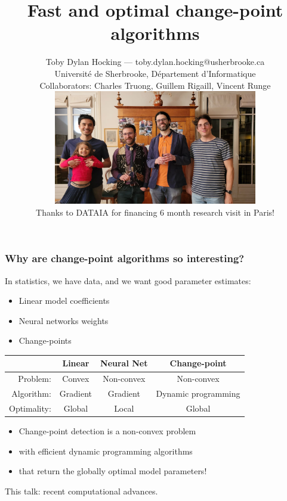 \documentclass{beamer}
\begin{document}
\title{
  Fast and optimal change-point algorithms
}

\author{
  Toby Dylan Hocking --- toby.dylan.hocking@usherbrooke.ca\\ 
  Université de Sherbrooke, Département d'Informatique\\
  Collaborators: Charles Truong, Guillem Rigaill, Vincent Runge\\
  \includegraphics[height=5cm]{2025-01-photo-charles-toby-guillem-vincent.jpg}\\
  Thanks to DATAIA for financing 6 month research visit in Paris!
}

\date{}

\maketitle

\begin{frame}
  \frametitle{Why are change-point algorithms so interesting?}

  In statistics, we have data, and we want good parameter estimates:
  \begin{itemize}
  \item Linear model coefficients
  \item Neural networks weights
  \item Change-points
  \end{itemize}

  \begin{tabular}{rccc}
    \hline
    & Linear & Neural Net & Change-point \\
    \hline 
    Problem:  & Convex & Non-convex & Non-convex \\
    Algorithm: & Gradient & Gradient & Dynamic programming \\
    Optimality: & Global & Local & Global \\
    \hline
  \end{tabular}

  \begin{itemize}
  \item Change-point detection is a non-convex problem
  \item with efficient dynamic programming algorithms
  \item that return the globally optimal model parameters!
  \end{itemize}

  This talk: recent computational advances.
\end{frame}
\end{document}
